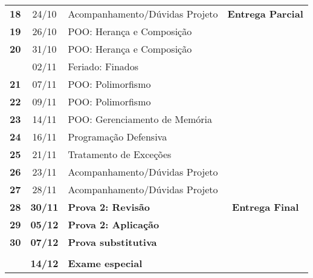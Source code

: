 \documentclass[11pt]{article}
\begin{document}
\begin{center}
\begin{tabular}{>{\bfseries}ccl>{\bfseries}c}
18 & 24/10 & Acompanhamento/Dúvidas Projeto & Entrega Parcial\\[0pt]
19 & 26/10 & POO: Herança e Composição & \\[0pt]
20 & 31/10 & POO: Herança e Composição & \\[0pt]
\rowcolor{green!40} & 02/11 & Feriado: Finados & \\[0pt]
21 & 07/11 & POO: Polimorfismo & \\[0pt]
22 & 09/11 & POO: Polimorfismo & \\[0pt]
23 & 14/11 & POO: Gerenciamento de Memória & \\[0pt]
24 & 16/11 & Programação Defensiva & \\[0pt]
25 & 21/11 & Tratamento de Exceções & \\[0pt]
26 & 23/11 & Acompanhamento/Dúvidas Projeto & \\[0pt]
27 & 28/11 & Acompanhamento/Dúvidas Projeto & \\[0pt]
\rowcolor{yellow!50} 28 & \textbf{30/11} & \textbf{Prova 2: Revisão} & Entrega Final\\[0pt]
\rowcolor{yellow!50} 29 & \textbf{05/12} & \textbf{Prova 2: Aplicação} & \\[0pt]
\rowcolor{yellow!50} 30 & \textbf{07/12} & \textbf{Prova substitutiva} & \\[0pt]
 &  &  & \\[0pt]
\rowcolor{yellow!50} & \textbf{14/12} & \textbf{Exame especial} & \\[0pt]
\bottomrule
\end{tabular}
\end{center}
\end{document}
